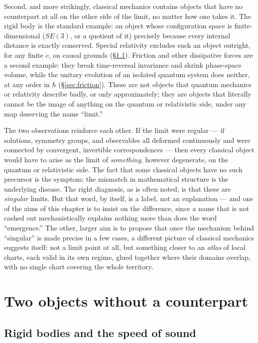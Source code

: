 Second, and more strikingly, classical mechanics contains objects that have no
counterpart at all on the other side of the limit, no matter how one takes it.
The rigid body is the standard example: an object whose configuration space is
finite-dimensional ($SE(3)$, or a quotient of it) precisely because every
internal distance is exactly conserved. Special relativity excludes such an
object outright, for any finite $c$, on causal grounds (\S\ref{sec:rigid}).
Friction and other dissipative forces are a second example: they break
time-reversal invariance and shrink phase-space volume, while the unitary
evolution of an isolated quantum system does neither, at any order in $\hbar$
(\S\ref{sec:friction}). These are not objects that quantum mechanics or
relativity describe badly, or only approximately; they are objects that
literally cannot be the image of anything on the quantum or relativistic side,
under any map deserving the name ``limit.''

The two observations reinforce each other. If the limit were regular --- if
solutions, symmetry groups, and observables all deformed continuously and were
connected by convergent, invertible correspondences --- then every classical
object would have to arise as the limit of \emph{something}, however
degenerate, on the quantum or relativistic side. The fact that some classical
objects have no such precursor is the symptom; the mismatch in mathematical
structure is the underlying disease. The right diagnosis, as is often noted, is
that these are \emph{singular} limits. But that word, by itself, is a label,
not an explanation --- and one of the aims of this chapter is to insist on the
difference, since a name that is not cashed out mechanistically explains
nothing more than does the word ``emergence.'' The other, larger aim is to
propose that once the mechanism behind ``singular'' is made precise in a few
cases, a different picture of classical mechanics suggests itself: not a limit
point at all, but something closer to an \emph{atlas} of local charts, each
valid in its own regime, glued together where their domains overlap, with no
single chart covering the whole territory.

\section{Two objects without a counterpart}

\subsection{Rigid bodies and the speed of sound}
\label{sec:rigid}

